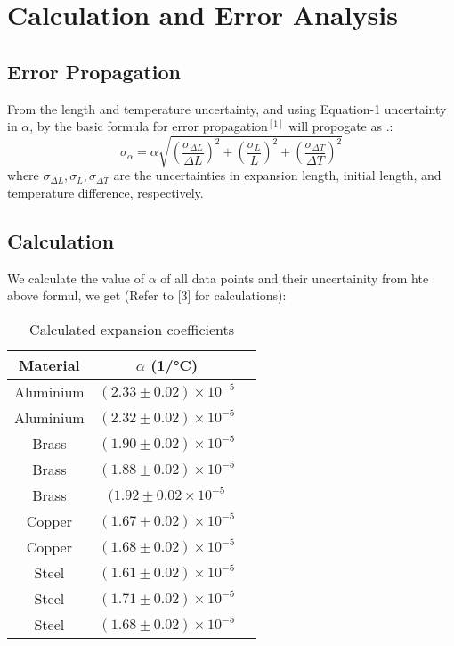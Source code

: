 \documentclass[%
 sor,
 jor,
 amsmath,amssymb,
 reprint,
]{revtex4-2}
\begin{document}
\section{Calculation and Error Analysis}
\subsection{Error Propagation}
From the length and temperature uncertainty, and using Equation-1 uncertainty in $\alpha$, by the basic formula for error propagation$^{[1]}$ will propogate as .:
\[
\sigma_{\alpha} = \alpha \sqrt{\left( \frac{\sigma_{\Delta L}}{\Delta L} \right)^2 + \left( \frac{\sigma_L}{L} \right)^2 + \left( \frac{\sigma_{\Delta T}}{\Delta T} \right)^2}
\]
where $\sigma_{\Delta L}, \sigma_L, \sigma_{\Delta T}$ are the uncertainties in expansion length, initial length, and temperature difference, respectively.

\subsection{Calculation}
We calculate the value of $\alpha$ of all data points and their uncertainity from hte above formul,  we get (Refer to [3] for calculations):

\begin{table}[h]
\centering
\begin{tabular}{ccc}
\hline
Material & $\alpha$ (\si{1/\degreeCelsius}) \\
\hline
Aluminium & $(2.33 \pm 0.02) \times 10^{-5}$ \\
Aluminium & $(2.32\pm 0.02) \times 10^{-5}$ \\
Brass & $(1.90\pm 0.02) \times 10^{-5}$ \\
Brass & $(1.88\pm 0.02) \times 10^{-5}$ \\
Brass & $(1.92\pm 0.02 \times 10^{-5}$ \\
Copper & $(1.67\pm 0.02) \times 10^{-5}$ \\
Copper & $(1.68\pm 0.02) \times 10^{-5}$ \\
Steel & $(1.61\pm 0.02) \times 10^{-5}$ \\
Steel & $(1.71\pm 0.02) \times 10^{-5}$ \\
Steel & $(1.68\pm 0.02) \times 10^{-5}$ \\

\hline


\end{tabular}
\caption{Calculated expansion coefficients}
\end{table}
\end{document}
